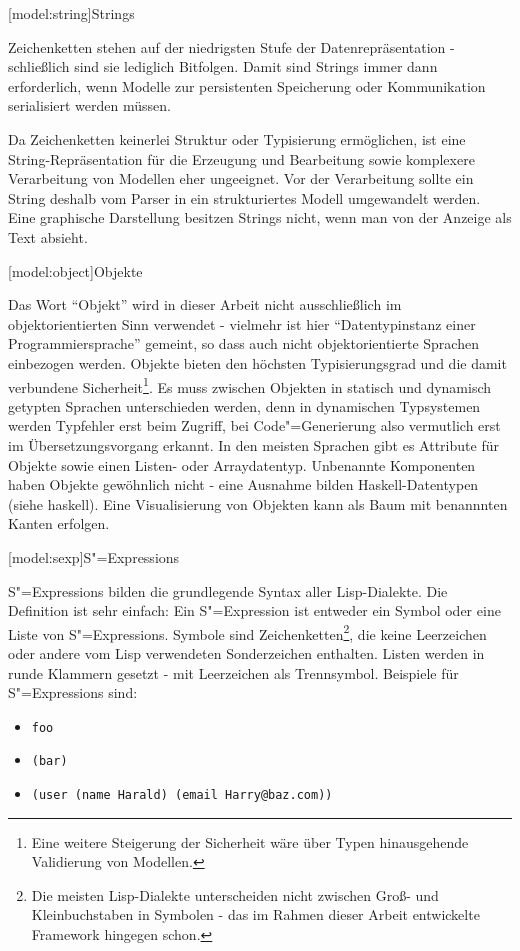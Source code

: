 \documentclass[11pt, a4paper, bibgerm]{scrbook}
\newcommand\icode[1]{\lstinline?#1?}
\newcommand\lsection{}
\newcommand\sref{}
\newcommand{\sees}[1]{(siehe \sref{#1})}
\newcommand{\sexp}{S"=Expression}
\newcommand{\sexps}{S"=Expressions}
\newcommand{\cgen}{Code"=Generierung}
\begin{document}
\lsection[model:string]{Strings}

Zeichenketten stehen auf der niedrigsten Stufe der Datenrepräsentation -
schließlich sind sie lediglich Bitfolgen. Damit sind Strings immer dann
erforderlich, wenn Modelle zur persistenten Speicherung oder
Kommunikation serialisiert werden müssen.

Da Zeichenketten keinerlei Struktur oder Typisierung ermöglichen, ist
eine String-Repräsentation für die Erzeugung und Bearbeitung sowie
komplexere Verarbeitung von Modellen eher ungeeignet. Vor der
Verarbeitung sollte ein String deshalb vom Parser in ein strukturiertes
Modell umgewandelt werden. Eine graphische Darstellung besitzen Strings
nicht, wenn man von der Anzeige als Text absieht.

\lsection[model:object]{Objekte}

Das Wort ``Objekt'' wird in dieser Arbeit nicht ausschließlich im
objektorientierten Sinn verwendet - vielmehr ist hier "`Datentypinstanz
einer Programmiersprache"' gemeint, so dass auch nicht objektorientierte
Sprachen einbezogen werden. Objekte bieten den höchsten Typisierungsgrad
und die damit verbundene Sicherheit\footnote{Eine weitere Steigerung der
  Sicherheit wäre über Typen hinausgehende Validierung von
  Modellen.}. Es muss zwischen Objekten in statisch und dynamisch
getypten Sprachen unterschieden werden, denn in dynamischen Typsystemen
werden Typfehler erst beim Zugriff, bei \cgen{} also vermutlich erst im
Übersetzungsvorgang erkannt. In den meisten Sprachen gibt es Attribute
für Objekte sowie einen Listen- oder Arraydatentyp. Unbenannte
Komponenten haben Objekte gewöhnlich nicht - eine Ausnahme bilden
Haskell-Datentypen \sees{haskell}. Eine Visualisierung von
Objekten kann als Baum mit benannnten Kanten erfolgen.

\lsection[model:sexp]{\sexps}

\sexps{} bilden die grundlegende Syntax aller Lisp-Dialekte. Die
Definition ist sehr einfach: Ein \sexp{} ist entweder ein Symbol oder
eine Liste von \sexps{}. Symbole sind Zeichenketten\footnote{Die meisten
  Lisp-Dialekte unterscheiden nicht zwischen Groß- und Kleinbuchstaben
  in Symbolen - das im Rahmen dieser Arbeit entwickelte Framework
  hingegen schon.}, die keine Leerzeichen oder andere vom Lisp
verwendeten Sonderzeichen enthalten. Listen werden in runde Klammern
gesetzt - mit Leerzeichen als Trennsymbol. Beispiele für \sexps{} sind:
\begin{itemize}
\item \icode{foo}
\item \icode{(bar)}
\item \icode{(user (name Harald) (email Harry@baz.com))}
\end{itemize}
\end{document}
